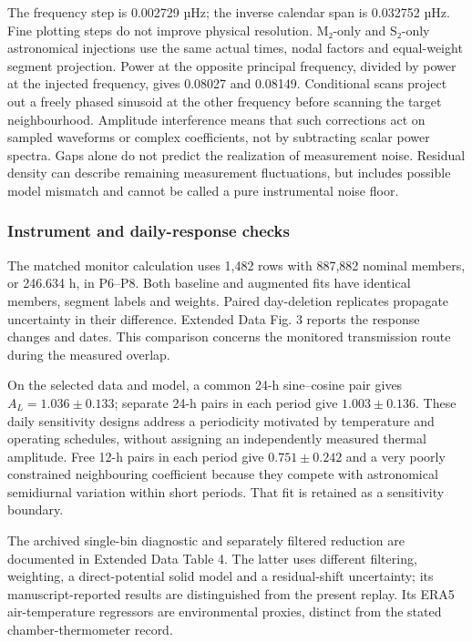 \documentclass[
  10pt,
  a4paper,
]{article}
\begin{document}
The frequency step is 0.002729 µHz; the inverse calendar span is
0.032752 µHz. Fine plotting steps do not improve physical resolution.
M₂-only and S₂-only astronomical injections use the same actual times,
nodal factors and equal-weight segment projection. Power at the opposite
principal frequency, divided by power at the injected frequency, gives
0.08027 and 0.08149. Conditional scans project out a freely phased
sinusoid at the other frequency before scanning the target
neighbourhood. Amplitude interference means that such corrections act on
sampled waveforms or complex coefficients, not by subtracting scalar
power spectra. Gaps alone do not predict the realization of measurement
noise. Residual density can describe remaining measurement fluctuations,
but includes possible model mismatch and cannot be called a pure
instrumental noise floor.

\hypertarget{instrument-and-daily-response-checks}{%
\subsubsection{Instrument and daily-response
checks}\label{instrument-and-daily-response-checks}}

The matched monitor calculation uses 1,482 rows with 887,882 nominal
members, or 246.634 h, in P6--P8. Both baseline and augmented fits have
identical members, segment labels and weights. Paired day-deletion
replicates propagate uncertainty in their difference. Extended Data Fig.
3 reports the response changes and dates. This comparison concerns the
monitored transmission route during the measured overlap.

On the selected data and model, a common 24-h sine--cosine pair gives
\(A_L=1.036\pm0.133\); separate 24-h pairs in each period give
\(1.003\pm0.136\). These daily sensitivity designs address a periodicity
motivated by temperature and operating schedules, without assigning an
independently measured thermal amplitude. Free 12-h pairs in each period
give \(0.751\pm0.242\) and a very poorly constrained neighbouring
coefficient because they compete with astronomical semidiurnal variation
within short periods. That fit is retained as a sensitivity boundary.

The archived single-bin diagnostic and separately filtered reduction are
documented in Extended Data Table 4. The latter uses different
filtering, weighting, a direct-potential solid model and a
residual-shift uncertainty; its manuscript-reported results are
distinguished from the present replay. Its ERA5 air-temperature
regressors are environmental proxies, distinct from the stated
chamber-thermometer record.
\end{document}
